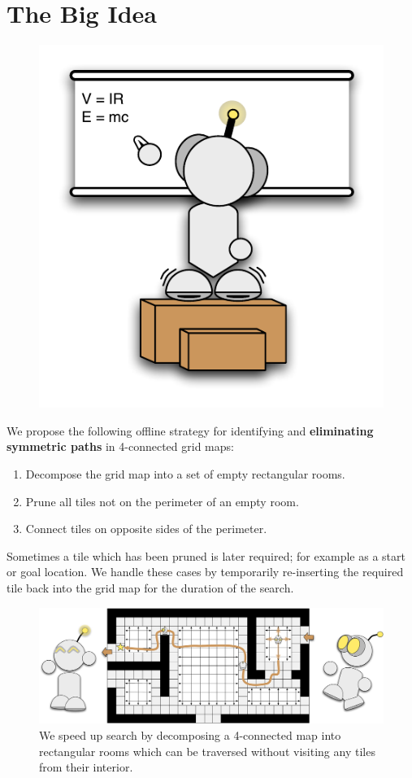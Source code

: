 \section{The Big Idea}
 \begin{figure}
		\includegraphics[width=0.25\columnwidth, trim=10mm 10mm 10mm 10mm]{diagrams/robot_whiteboard.pdf}
 \end{figure}
We propose the following offline strategy for identifying and \textbf{eliminating
symmetric paths} in 4-connected grid maps:
\begin{enumerate}
\item{Decompose the grid map into a set of empty rectangular rooms.}
\item{Prune all tiles not on the perimeter of an empty room.}
\item{Connect tiles on opposite sides of the perimeter.}
\end{enumerate}
Sometimes a tile which has been pruned is later required; for example as a start
or goal location. 
We handle these cases by temporarily re-inserting the 
required tile back into the grid map for the duration of the search.

\begin{figure}[t]
\begin{minipage}{18in}
\label{fig:splash}
\begin{center}
\includegraphics[width=18in]{diagrams/robot_splash2}
\caption{We speed up search by decomposing a 4-connected map into rectangular
rooms which can be traversed without visiting any tiles from their interior.} 
\end{center}
\end{minipage}
\vspace{2em}
\end{figure}
